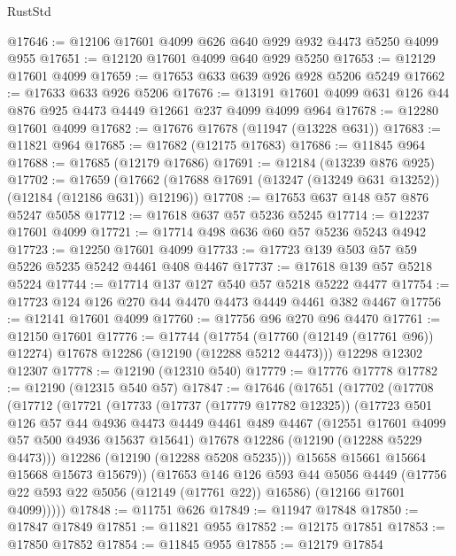 \begin{lexlean}{RustStd}
\begin{coremodule}
@17646 := @12106 @17601 @4099 @626 @640 @929 @932 @4473 @5250 @4099 @955
@17651 := @12120 @17601 @4099 @640 @929 @5250
@17653 := @12129 @17601 @4099
@17659 := @17653 @633 @639 @926 @928 @5206 @5249
@17662 := @17633 @633 @926 @5206
@17676 := @13191 @17601 @4099 @631 @126 @44 @876 @925 @4473 @4449 @12661 @237 @4099 @4099 @964
@17678 := @12280 @17601 @4099
@17682 := @17676 @17678 (@11947 (@13228 @631))
@17683 := @11821 @964
@17685 := @17682 (@12175 @17683)
@17686 := @11845 @964
@17688 := @17685 (@12179 @17686)
@17691 := @12184 (@13239 @876 @925)
@17702 := @17659
    (@17662 (@17688 @17691 (@13247 (@13249 @631 @13252)) (@12184 (@12186 @631)) @12196))
@17708 := @17653 @637 @148 @57 @876 @5247 @5058
@17712 := @17618 @637 @57 @5236 @5245
@17714 := @12237 @17601 @4099
@17721 := @17714 @498 @636 @60 @57 @5236 @5243 @4942
@17723 := @12250 @17601 @4099
@17733 := @17723 @139 @503 @57 @59 @5226 @5235 @5242 @4461 @408 @4467
@17737 := @17618 @139 @57 @5218 @5224
@17744 := @17714 @137 @127 @540 @57 @5218 @5222 @4477
@17754 := @17723 @124 @126 @270 @44 @4470 @4473 @4449 @4461 @382 @4467
@17756 := @12141 @17601 @4099
@17760 := @17756 @96 @270 @96 @4470
@17761 := @12150 @17601
@17776 := @17744
    (@17754 (@17760 (@12149 (@17761 @96)) @12274) @17678 @12286 (@12190 (@12288 @5212 @4473)))
    @12298
    @12302
    @12307
@17778 := @12190 (@12310 @540)
@17779 := @17776 @17778
@17782 := @12190 (@12315 @540 @57)
@17847 := @17646
    (@17651
      (@17702
        (@17708
          (@17712
            (@17721
              (@17733
                (@17737 (@17779 @17782 @12325))
                (@17723
                  @501
                  @126
                  @57
                  @44
                  @4936
                  @4473
                  @4449
                  @4461
                  @489
                  @4467
                  (@12551 @17601 @4099 @57 @500 @4936 @15637 @15641)
                  @17678
                  @12286
                  (@12190 (@12288 @5229 @4473)))
                @12286
                (@12190 (@12288 @5208 @5235)))
              @15658
              @15661
              @15664
              @15668
              @15673
              @15679))
          (@17653
            @146
            @126
            @593
            @44
            @5056
            @4449
            (@17756 @22 @593 @22 @5056 (@12149 (@17761 @22)) @16586)
            (@12166 @17601 @4099)))))
@17848 := @11751 @626
@17849 := @11947 @17848
@17850 := @17847 @17849
@17851 := @11821 @955
@17852 := @12175 @17851
@17853 := @17850 @17852
@17854 := @11845 @955
@17855 := @12179 @17854

\end{coremodule}
\end{lexlean}
